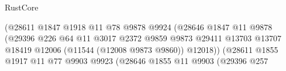 \begin{lexlean}{RustCore}
\begin{coremodule}
                                                        (@28611
                                                          @1847
                                                          @1918
                                                          @11
                                                          @78
                                                          @9878
                                                          @9924
                                                          (@28646
                                                            @1847
                                                            @11
                                                            @9878
                                                            (@29396
                                                              @226
                                                              @64
                                                              @11
                                                              @3017
                                                              @2372
                                                              @9859
                                                              @9873
                                                              @29411
                                                              @13703
                                                              @13707
                                                              @18419
                                                              @12006
                                                              (@11544 (@12008 @9873 @9860))
                                                              @12018))
                                                          (@28611
                                                            @1855
                                                            @1917
                                                            @11
                                                            @77
                                                            @9903
                                                            @9923
                                                            (@28646
                                                              @1855
                                                              @11
                                                              @9903
                                                              (@29396
                                                                @257

\end{coremodule}
\end{lexlean}
